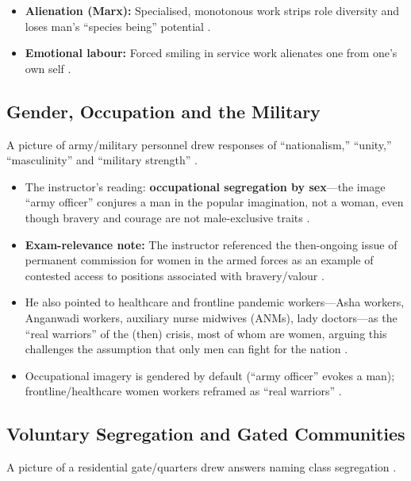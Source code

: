 \begin{QuickRevision}
\begin{itemize}
    \item \textbf{Alienation (Marx):} Specialised, monotonous work strips role diversity and loses man's ``species being'' potential .
    \item \textbf{Emotional labour:} Forced smiling in service work alienates one from one's own self .
\end{itemize}
\end{QuickRevision}

\subsection{Gender, Occupation and the Military}
A picture of army/military personnel drew responses of ``nationalism,'' ``unity,'' ``masculinity'' and ``military strength'' .

\begin{CriticalPoint}
\begin{itemize}
    \item The instructor's reading: \textbf{occupational segregation by sex}---the image ``army officer'' conjures a man in the popular imagination, not a woman, even though bravery and courage are not male-exclusive traits .
    \item \textbf{Exam-relevance note:} The instructor referenced the then-ongoing issue of permanent commission for women in the armed forces as an example of contested access to positions associated with bravery/valour .
    \item He also pointed to healthcare and frontline pandemic workers---Asha workers, Anganwadi workers, auxiliary nurse midwives (ANMs), lady doctors---as the ``real warriors'' of the (then) crisis, most of whom are women, arguing this challenges the assumption that only men can fight for the nation .
\end{itemize}
\end{CriticalPoint}

\begin{QuickRevision}
\begin{itemize}
    \item Occupational imagery is gendered by default (``army officer'' evokes a man); frontline/healthcare women workers reframed as ``real warriors'' .
\end{itemize}
\end{QuickRevision}

\subsection{Voluntary Segregation and Gated Communities}
A picture of a residential gate/quarters drew answers naming class segregation .

